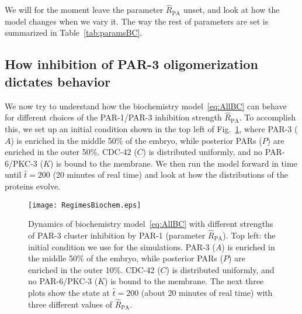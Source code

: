 \documentclass[11pt]{article}
\newcommand{\6}[1]{#1_{\text{6}}}
\newcommand{\3}[1]{#1_{\text{3}}}
\begin{document}
We will for the moment leave the parameter $\hat R_\text{PA}$ unset, and look at how the model changes when we vary it. The way the rest of parameters are set is summarized in Table\ \ref{tab:paramsBC}.

\subsection{How inhibition of PAR-3 oligomerization dictates behavior}
We now try to understand how the biochemistry model\ \eqref{eq:AllBC} can behave for different choices of the PAR-1/PAR-3 inhibition strength $\hat R_\text{PA}$. To accomplish this, we set up an initial condition shown in the top left of Fig.\ \ref{fig:BCRegimes}, where PAR-3 ($A$) is enriched in the middle 50\% of the embryo, while posterior PARs ($P$) are enriched in the outer 50\%. CDC-42 ($C$) is distributed uniformly, and no PAR-6/PKC-3 ($K$) is bound to the membrane. We then run the model forward in time until $\hat t = 200$ (20 minutes of real time) and look at how the distributions of the proteins evolve. 

\begin{figure}
\centering
\texttt{[image: RegimesBiochem.eps]}
\caption{\label{fig:BCRegimes}Dynamics of biochemistry model\ \eqref{eq:AllBC} with different strengths of PAR-3 cluster inhibition by PAR-1 (parameter $\hat R_\text{PA}$). Top left: the initial condition we use for the simulations. PAR-3 ($A$) is enriched in the middle 50\% of the embryo, while posterior PARs ($P$) are enriched in the outer 10\%. CDC-42 ($C$) is distributed uniformly, and no PAR-6/PKC-3 ($K$) is bound to the membrane. The next three plots show the state at $\hat t = 200$ (about 20 minutes of real time) with three different values of $\hat R_\text{PA}$. }
\end{figure}
\end{document}
